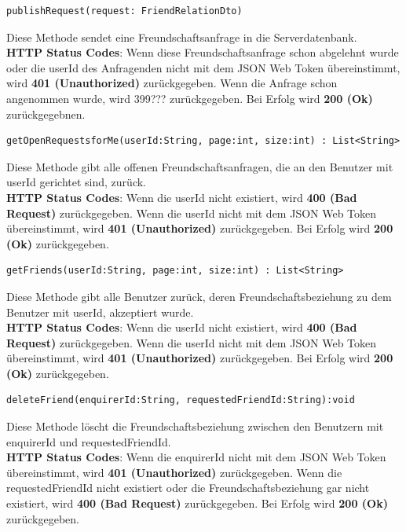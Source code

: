  \begin{lstlisting}
publishRequest(request: FriendRelationDto)
\end{lstlisting}
Diese Methode sendet eine Freundschaftsanfrage in die Serverdatenbank.\\
\textbf{HTTP Status Codes}:
Wenn diese Freundschaftsanfrage schon abgelehnt wurde oder die userId des Anfragenden nicht mit dem JSON Web Token übereinstimmt, wird \textbf{401 (Unauthorized)} zurückgegeben. Wenn die Anfrage schon angenommen wurde, wird 399??? zurückgegeben. Bei Erfolg wird \textbf{200 (Ok)} zurückgegebnen.
\vspace{1cm}
 \begin{lstlisting}
getOpenRequestsforMe(userId:String, page:int, size:int) : List<String>
\end{lstlisting}
Diese Methode gibt alle offenen Freundschaftsanfragen, die an den Benutzer mit userId gerichtet sind, zurück.\\
\textbf{HTTP Status Codes}:
Wenn die userId nicht existiert, wird \textbf{400 (Bad Request)} zurückgegeben. Wenn die userId nicht mit dem JSON Web Token übereinstimmt, wird \textbf{401 (Unauthorized)} zurückgegeben. Bei Erfolg wird \textbf{200 (Ok)} zurückgegeben.
\vspace{1cm}
 \begin{lstlisting}
getFriends(userId:String, page:int, size:int) : List<String>
\end{lstlisting}
Diese Methode gibt alle Benutzer zurück, deren Freundschaftsbeziehung zu dem Benutzer mit userId, akzeptiert wurde.\\
\textbf{HTTP Status Codes}:
Wenn die userId nicht existiert, wird \textbf{400 (Bad Request)} zurückgegeben. Wenn die userId nicht mit dem JSON Web Token übereinstimmt, wird \textbf{401 (Unauthorized)} zurückgegeben. Bei Erfolg wird \textbf{200 (Ok)} zurückgegeben.
\vspace{1cm}
 \begin{lstlisting}
deleteFriend(enquirerId:String, requestedFriendId:String):void
\end{lstlisting}
Diese Methode löscht die Freundschaftsbeziehung zwischen den Benutzern mit enquirerId und requestedFriendId.\\
\textbf{HTTP Status Codes}:
Wenn die enquirerId nicht mit dem JSON Web Token übereinstimmt, wird \textbf{401 (Unauthorized)} zurückgegeben. Wenn die requestedFriendId nicht existiert oder die Freundschaftsbeziehung gar nicht existiert, wird \textbf{400 (Bad Request)} zurückgegeben. Bei Erfolg wird \textbf{200 (Ok)} zurückgegeben.
